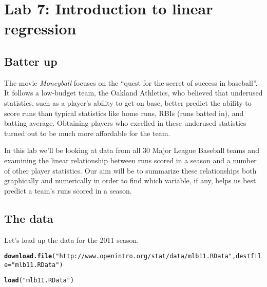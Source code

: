 \documentclass{article}\usepackage[]{graphicx}\usepackage[]{color}
\makeatletter
\newcommand{\hlstr}[1]{\textcolor[rgb]{0.192,0.494,0.8}{#1}}%
\newcommand{\hlstd}[1]{\textcolor[rgb]{0.345,0.345,0.345}{#1}}%
\newcommand{\hlkwc}[1]{\textcolor[rgb]{0.333,0.667,0.333}{#1}}%
\newcommand{\hlkwd}[1]{\textcolor[rgb]{0.737,0.353,0.396}{\textbf{#1}}}%
\newenvironment{kframe}{%
 \def\at@end@of@kframe{}%
 \ifinner\ifhmode%
  \def\at@end@of@kframe{\end{minipage}}%
  \begin{minipage}{\columnwidth}%
 \fi\fi%
 \def\FrameCommand##1{\hskip\@totalleftmargin \hskip-\fboxsep
 \colorbox{shadecolor}{##1}\hskip-\fboxsep
     \hskip-\linewidth \hskip-\@totalleftmargin \hskip\columnwidth}%
 \MakeFramed {\advance\hsize-\width
   \@totalleftmargin\z@ \linewidth\hsize
   \@setminipage}}%
 {\par\unskip\endMakeFramed%
 \at@end@of@kframe}
\newenvironment{knitrout}{}{} %
\makeatother
\begin{document}

\section*{Lab 7: Introduction to linear regression}

\subsection*{Batter up}

The movie \emph{Moneyball} focuses on the ``quest for the secret of success in baseball''.  It follows a low-budget team, the Oakland Athletics, who believed that underused statistics, such as a player's ability to get on base, better predict the ability to score runs than typical statistics like home runs, RBIs (runs batted in), and batting average.  Obtaining players who excelled in these underused statistics turned out to be much more affordable for the team.

In this lab we'll be looking at data from all 30 Major League Baseball teams and examining the linear relationship between runs scored in a season and a number of other player statistics.  Our aim will be to summarize these relationships both graphically and numerically in order to find which variable, if any, helps us best predict a team's runs scored in a season.

\subsection*{The data}
Let's load up the data for the 2011 season.

\begin{knitrout}
\color{fgcolor}\begin{kframe}
\begin{alltt}
\hlkwd{download.file}\hlstd{(}\hlstr{"http://www.openintro.org/stat/data/mlb11.RData"}\hlstd{,} \hlkwc{destfile} \hlstd{=} \hlstr{"mlb11.RData"}\hlstd{)}

\hlkwd{load}\hlstd{(}\hlstr{"mlb11.RData"}\hlstd{)}
\end{alltt}
\end{kframe}
\end{knitrout}
\end{document}
